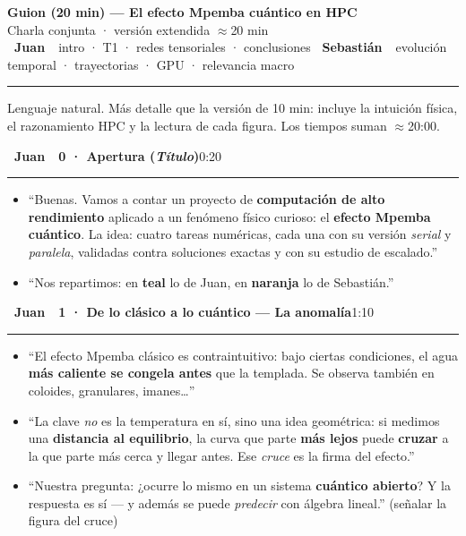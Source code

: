 \documentclass[11pt,a4paper]{article}
\newcommand{\Jb}{\colorbox{juan}{\color{white}\bfseries\footnotesize~Juan~}}
\newcommand{\Sb}{\colorbox{seb}{\color{white}\bfseries\footnotesize~Sebastián~}}
\newcommand{\cj}[1]{\textcolor{juan}{\textbf{#1}}}
\newcommand{\cs}[1]{\textcolor{seb}{\textbf{#1}}}
\newcommand{\blk}[3]{%
  \par\medskip\noindent #1\ \textbf{#2}\hfill\textcolor{soft}{\small #3}\par
  \vspace{-4pt}\textcolor{soft!40}{\rule{\linewidth}{0.4pt}}\par\vspace{-2pt}}
\begin{document}
\begin{center}
  {\LARGE\bfseries Guion (20 min) --- El efecto Mpemba cuántico en HPC}\\[2pt]
  {\small\textcolor{soft}{Charla conjunta · versión extendida $\approx$20 min}}\\[6pt]
  {\footnotesize \Jb\ \textcolor{soft}{intro · T1 · redes tensoriales · conclusiones}\qquad
   \Sb\ \textcolor{soft}{evolución temporal · trayectorias · GPU · relevancia macro}}
\end{center}
\medskip\hrule\smallskip
{\footnotesize\textcolor{soft}{Lenguaje natural. Más detalle que la versión de 10 min:
incluye la intuición física, el razonamiento HPC y la lectura de cada figura.
Los tiempos suman $\approx$20:00.}}

\blk{\Jb}{0 · Apertura (\emph{Título})}{0:20}
\begin{itemize}
  \item ``Buenas. Vamos a contar un proyecto de \textbf{computación de alto
    rendimiento} aplicado a un fenómeno físico curioso: el \textbf{efecto Mpemba
    cuántico}. La idea: cuatro tareas numéricas, cada una con su versión \emph{serial}
    y \emph{paralela}, validadas contra soluciones exactas y con su estudio de escalado.''
  \item ``Nos repartimos: en \cj{teal} lo de Juan, en \cs{naranja} lo de Sebastián.''
\end{itemize}

\blk{\Jb}{1 · De lo clásico a lo cuántico --- La anomalía}{1:10}
\begin{itemize}
  \item ``El efecto Mpemba clásico es contraintuitivo: bajo ciertas condiciones, el
    agua \textbf{más caliente se congela antes} que la templada. Se observa también en
    coloides, granulares, imanes\dots''
  \item ``La clave \emph{no} es la temperatura en sí, sino una idea geométrica: si
    medimos una \textbf{distancia al equilibrio}, la curva que parte \textbf{más lejos}
    puede \textbf{cruzar} a la que parte más cerca y llegar antes. Ese \emph{cruce} es
    la firma del efecto.''
  \item ``Nuestra pregunta: ¿ocurre lo mismo en un sistema \textbf{cuántico abierto}?
    Y la respuesta es sí --- y además se puede \emph{predecir} con álgebra lineal.''
    (señalar la figura del cruce)
\end{itemize}
\end{document}
